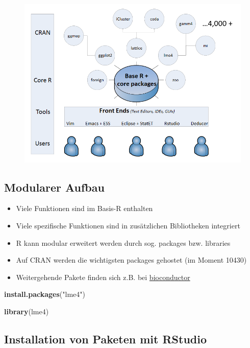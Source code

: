 \documentclass[]{article}
\newenvironment{Shaded}{\begin{snugshade}}{\end{snugshade}}
\newcommand{\KeywordTok}[1]{\textcolor[rgb]{0.13,0.29,0.53}{\textbf{{#1}}}}
\newcommand{\StringTok}[1]{\textcolor[rgb]{0.31,0.60,0.02}{{#1}}}
\newcommand{\NormalTok}[1]{{#1}}
\providecommand{\tightlist}{%
  \setlength{\itemsep}{0pt}\setlength{\parskip}{0pt}}
\begin{document}
\begin{figure}[htbp]
\centering
\includegraphics{figure/Packages.PNG}
\caption{}
\end{figure}

\subsection{Modularer Aufbau}\label{modularer-aufbau-1}

\begin{itemize}
\tightlist
\item
  Viele Funktionen sind im Basis-R enthalten
\item
  Viele spezifische Funktionen sind in zusätzlichen Bibliotheken
  integriert
\item
  R kann modular erweitert werden durch sog. packages bzw. libraries
\item
  Auf CRAN werden die wichtigsten packages gehostet (im Moment 10430)
\item
  Weitergehende Pakete finden sich z.B. bei
  \href{www.bioconductor.org}{bioconductor}
\end{itemize}

\begin{Shaded}
\begin{Highlighting}[]
\KeywordTok{install.packages}\NormalTok{(}\StringTok{"lme4"}\NormalTok{)}

\KeywordTok{library}\NormalTok{(lme4)}
\end{Highlighting}
\end{Shaded}

\subsection{Installation von Paketen mit
RStudio}\label{installation-von-paketen-mit-rstudio}
\end{document}
